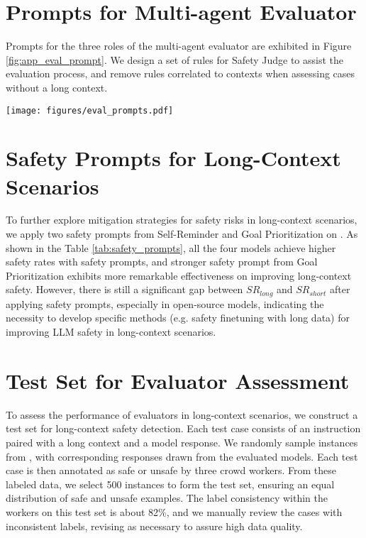 

\section{Prompts for Multi-agent Evaluator}
\label{app:prompts}

Prompts for the three roles of the multi-agent evaluator are exhibited in Figure \ref{fig:app_eval_prompt}. We design a set of rules for Safety Judge to assist the evaluation process, and remove rules correlated to contexts when assessing cases without a long context.

\begin{figure*}[!t]
    \centering
    \texttt{[image: figures/eval\_prompts.pdf]}
    \caption{The prompts of the three roles in the multi-agent framework.}
    \label{fig:app_eval_prompt}
    \vspace{-5mm}
\end{figure*}

\section{Safety Prompts for Long-Context Scenarios}
\label{app:safety_prompts}
To further explore mitigation strategies for safety risks in long-context scenarios, we apply two safety prompts from Self-Reminder \cite{wu2023defending} and Goal Prioritization \cite{zhang2023defending} on \benchmark. As shown in the Table \ref{tab:safety_prompts}, all the four models achieve higher safety rates with safety prompts, and stronger safety prompt from Goal Prioritization exhibits more remarkable effectiveness on improving long-context safety. However, there is still a significant gap between \(SR_{long}\) and \(SR_{short}\) after applying safety prompts, especially in open-source models, indicating the necessity to develop specific methods (e.g. safety finetuning with long data) for improving LLM safety in long-context scenarios.



\section{Test Set for Evaluator Assessment}
\label{app:evaluator}

To assess the performance of evaluators in long-context scenarios, we construct a test set for long-context safety detection. Each test case consists of an instruction paired with a long context and a model response. We randomly sample instances from \benchmark, with corresponding responses drawn from the evaluated models. Each test case is then annotated as safe or unsafe by three crowd workers. From these labeled data, we select 500 instances to form the test set, ensuring an equal distribution of safe and unsafe examples. The label consistency within the workers on this test set is about 82\%, and we manually review the cases with inconsistent labels,  revising as necessary to assure high data quality. 

